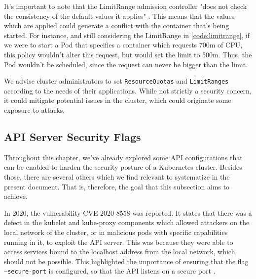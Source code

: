 \documentclass[a4paper,11pt,openright,BCOR=15mm]{scrbook}
\begin{document}
It's important to note that the LimitRange admission controller "does not check the consistency of the default values it applies" \cite{the_linux_foundation_limit_2024}. This means that the values which are applied could generate a conflict with the container that's being started. For instance, and still considering the LimitRange in \ref{code:limitrange}, if we were to start a Pod that specifies a container which requests 700m of CPU, this policy wouldn't alter this request, but would set the limit to 500m. Thus, the Pod wouldn't be scheduled, since the request can never be bigger than the limit.

We advise cluster administrators to set \texttt{ResourceQuotas} and \texttt{LimitRanges} according to the needs of their applications. While not strictly a security concern, it could mitigate potential issues in the cluster, which could originate some exposure to attacks.

\subsection{API Server Security Flags}



%
%
%
%
%
%
%
%


Throughout this chapter, we've already explored some API configurations that can be enabled to harden the security posture of a Kubernetes cluster. Besides those, there are several others which we find relevant to systematize in the present document. That is, therefore, the goal that this subsection aims to achieve.


In 2020, the vulnerability CVE-2020-8558 \cite{national_institute_of_standards_and_technology_nvd_2020} was reported. It states that there was a defect in the kubelet and kube-proxy components which allowed attackers on the local network of the cluster, or in malicious pods with specific capabilities running in it, to exploit the API server. This was because they were able to access services bound to the localhost address from the local network, which should not be possible. This highlighted the importance of ensuring that the flag \texttt{--secure-port} is configured, so that the API listens on a secure port \cite{the_linux_foundation_kube-apiserver_2024}.
\end{document}
